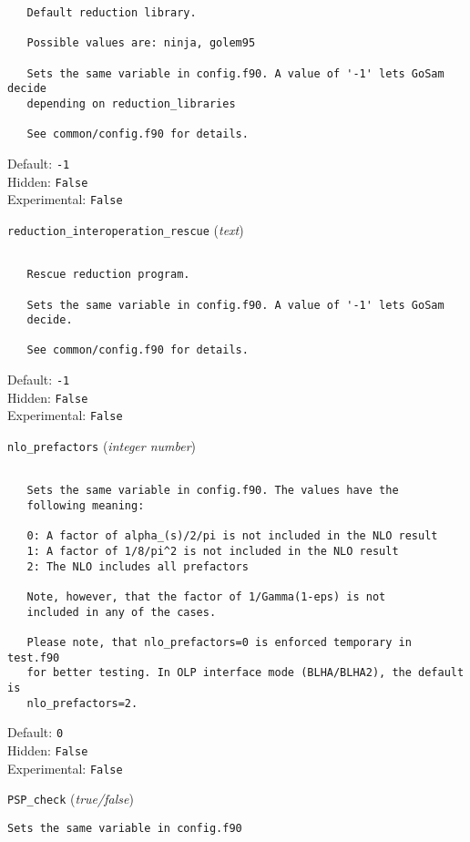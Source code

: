 \begin{basedescript}{\desclabelstyle{\pushlabel}}
\begin{verbatim}
   Default reduction library.

   Possible values are: ninja, golem95

   Sets the same variable in config.f90. A value of '-1' lets GoSam decide
   depending on reduction_libraries

   See common/config.f90 for details.
\end{verbatim}
Default: \verb|-1|
\\Hidden: \verb|False|
\\Experimental: \verb|False|
\\\item[\colorbox{gray!30}{\texttt{reduction\_interoperation\_rescue}}] (\textit{text})
\begin{verbatim}

   Rescue reduction program.

   Sets the same variable in config.f90. A value of '-1' lets GoSam
   decide.

   See common/config.f90 for details.
\end{verbatim}
Default: \verb|-1|
\\Hidden: \verb|False|
\\Experimental: \verb|False|
\\\item[\colorbox{gray!30}{\texttt{nlo\_prefactors}}] (\textit{integer number})
\begin{verbatim}

   Sets the same variable in config.f90. The values have the
   following meaning:

   0: A factor of alpha_(s)/2/pi is not included in the NLO result
   1: A factor of 1/8/pi^2 is not included in the NLO result
   2: The NLO includes all prefactors

   Note, however, that the factor of 1/Gamma(1-eps) is not
   included in any of the cases.

   Please note, that nlo_prefactors=0 is enforced temporary in test.f90
   for better testing. In OLP interface mode (BLHA/BLHA2), the default is
   nlo_prefactors=2.
\end{verbatim}
Default: \verb|0|
\\Hidden: \verb|False|
\\Experimental: \verb|False|
\\\item[\colorbox{gray!30}{\texttt{PSP\_check}}] (\textit{true/false})
\begin{verbatim}
Sets the same variable in config.f90


\end{verbatim}
\end{basedescript}
